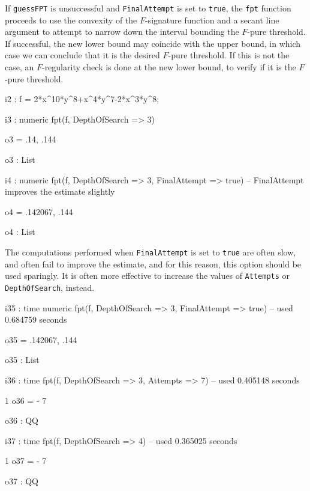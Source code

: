 \documentclass{amsart}
\begin{document}

If \texttt{guessFPT} is unsuccessful and \texttt{FinalAttempt} is set to \texttt{true}, the \texttt{fpt} function proceeds to use the convexity of the $F$-signature function and a secant line argument to attempt to narrow down the interval bounding the $F$-pure threshold.
If successful, the new lower bound may coincide with the upper bound, in which case we can conclude that it is the desired $F$-pure threshold.
If this is not the case, an $F$-regularity check is done at the new lower bound, to verify if it is the $F$-pure threshold.

\bigskip
{\small
{}
\begin{MyVerbatim}
i2 : f = 2*x^10*y^8+x^4*y^7-2*x^3*y^8;

i3 : numeric fpt(f, DepthOfSearch => 3)

o3 = {.14, .144}

o3 : List

i4 : numeric fpt(f, DepthOfSearch => 3, FinalAttempt => true)
     -- FinalAttempt improves the estimate slightly

o4 = {.142067, .144}

o4 : List
\end{MyVerbatim}
}
\bigskip

The computations performed when \texttt{FinalAttempt} is set to \texttt{true} are often slow, and often fail to improve the estimate, and for this reason, this option should be used sparingly. It is often more effective to increase the values of \texttt{Attempts} or \texttt{DepthOfSearch}, instead.

\bigskip
{\small
{}
\begin{MyVerbatim}
i35 : time numeric fpt(f, DepthOfSearch => 3, FinalAttempt => true)
     -- used 0.684759 seconds

o35 = {.142067, .144}

o35 : List

i36 : time fpt(f, DepthOfSearch => 3, Attempts => 7) 
     -- used 0.405148 seconds

      1
o36 = -
      7

o36 : QQ

i37 : time fpt(f, DepthOfSearch => 4) 
     -- used 0.365025 seconds

      1
o37 = -
      7

o37 : QQ
\end{MyVerbatim}
}
\bigskip
\end{document}
